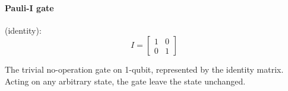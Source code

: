 \paragraph{Pauli-I gate} (identity):
\[
I = \begin{bmatrix}1 & 0 \\ 0 & 1 \end{bmatrix}
\]
\begin{center}

\end{center}
The trivial no-operation gate on 1-qubit, represented by the identity matrix. Acting on any arbitrary state, the gate leave the state unchanged.%
%
%
%
%
%    
%
%
